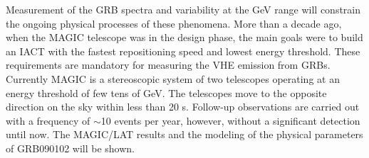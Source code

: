 


\bigskip



\bigskip

\noindent Measurement of the GRB spectra and variability at the GeV range will constrain the ongoing physical processes of these phenomena. More than a decade ago, when the MAGIC telescope was in the design phase, the main goals were to build an IACT with the fastest repositioning speed and lowest energy threshold. These requirements are mandatory for measuring the VHE emission from GRBs. Currently MAGIC is a stereoscopic system of two telescopes operating at an energy threshold of few tens of GeV. The telescopes move to the opposite direction on the sky within less than 20 s. Follow-up observations are carried out with a frequency of $\sim$10 events per year, however, without a significant detection until now. The MAGIC/LAT results and the modeling of the physical parameters of GRB090102 will be shown.

